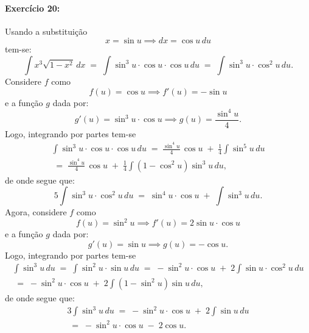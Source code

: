 \documentclass[12pt]{article}
\begin{document}
\paragraph{Exercício 20:}
Usando a substituição
\begin{equation*}
x = \sin u
\implies dx = \cos u\,du
\end{equation*}
tem-se:
\begin{equation}\label{ex-20:eqn-1}
\int x^{3}\sqrt{1-x^{2}}\,dx
\;=\; \int\sin^{3}u\cdot\cos u\cdot\cos u\,du
\;=\; \int\sin^{3}u\cdot\cos^{2}u\,du.
\end{equation}
Considere $f$ como
\begin{equation*}
f(u) = \cos u
\implies f'(u) = -\sin u
\end{equation*}
e a função $g$ dada por:
\begin{equation*}
g'(u) = \sin^{3}u\cdot\cos u
\implies g(u) = \frac{\sin^{4}u}{4}.
\end{equation*}
Logo, integrando por partes tem-se
\begin{multline*}
\int\sin^{3}u\cdot\cos u\cdot\cos u\,du
\;=\; \frac{\sin^{4}u}{4}\,\cos u \;+\; \frac{1}{4}\int\sin^{5} u\,du \\
\;=\; \frac{\sin^{4}u}{4}\,\cos u \;+\; \frac{1}{4}\int(1-\cos^{2}u)\sin^{3}u\,du,
\end{multline*}
de onde segue que:
\begin{equation}\label{ex-20:eqn-2}
5\int\sin^{3}u\cdot\cos^{2}u\,du
\;=\; \sin^{4}u\cdot\cos u \;+\; \int\sin^{3}u\,du.
\end{equation}
Agora, considere $f$ como
\begin{equation*}
f(u) = \sin^{2} u
\implies f'(u) = 2\sin u\cdot\cos u
\end{equation*}
e a função $g$ dada por:
\begin{equation*}
g'(u) = \sin u
\implies g(u) = -\cos u.
\end{equation*}
Logo, integrando por partes tem-se
\begin{multline*}
\int\sin^{3}u\,du
\;=\; \int\sin^{2}u\cdot\sin u\,du
\;=\; -\sin^{2}u\cdot\cos u \;+\; 2\int\sin u\cdot\cos^{2}u\,du \\
\;=\; -\sin^{2}u\cdot\cos u \;+\; 2\int(1-\sin^{2}u)\sin u\,du,
\end{multline*}
de onde segue que:
\begin{multline}\label{ex-20:eqn-3}
3\int\sin^{3}u\,du
\;=\; -\sin^{2}u\cdot\cos u \;+\; 2\int\sin u\,du \\
\;=\; -\sin^{2}u\cdot\cos u \;-\; 2\cos u.
\end{multline}
\end{document}
